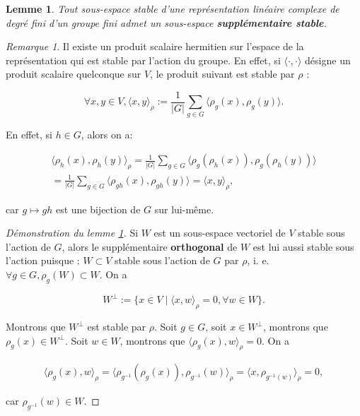 \documentclass[french]{book}
\newtheorem*{protolemma}{Lemme}
\newenvironment{lemma}
    {\colorlet{shadecolor}{pink!15}\begin{shaded}\begin{protolemma}}
    {\end{protolemma}\end{shaded}}
\theoremstyle{definition}
\theoremstyle{remark}
\newtheorem*{remark}{Remarque}
\begin{document}
\begin{lemma}\label{lemme-maschke}
  Tout sous-espace stable d'une représentation linéaire complexe de degré fini d'un groupe fini admet un sous-espace \textbf{supplémentaire \emph{stable}}.
\end{lemma}

\begin{remark}
  {\selectfont{}\relax} Il existe un produit scalaire hermitien sur l'espace de la représentation qui est stable par l'action du groupe. En effet, si \(\langle \cdot, \cdot \rangle \) désigne un produit scalaire quelconque sur \(V\), le produit suivant est stable par \(\rho\) :

  \[\forall x, y \in V, \langle x, y \rangle_{\rho} := \frac{1}{\lvert G \rvert} \sum_{g \in G}^{} \langle \rho_g(x), \rho_g(y) \rangle. \]

  En effet, si \(h \in G\), alors on a:

  \begin{gather*}
    \langle \rho_h(x), \rho_h(y) \rangle _{\rho} = \frac{1}{\lvert G \rvert} \sum_{g \in G}^{} \langle \rho_g(\rho_h(x)), \rho_g (\rho_h(y)) \rangle  \\
    = \frac{1}{\lvert G \rvert} \sum_{g \in G}^{} \langle \rho _{gh}(x), \rho _{gh}(y) \rangle  = \langle x, y \rangle _{\rho},
  \end{gather*}

  car \(g \longmapsto gh\) est une bijection de \(G\) sur lui-même.
\end{remark}


\begin{proof}[Démonstration du lemme \ref{lemme-maschke}]
  Si \(W\) est un sous-espace vectoriel de \(V\) stable sous l'action de \(G\), alors le supplémentaire \textbf{orthogonal} de \(W\) est lui aussi stable sous l'action puisque : \(W \subset V\) stable sous l'action de \(G\) par \(\rho\), i. e. \( \forall g \in G, \rho_g(W) \subset W\). On a

  \[W ^{\perp} := \{  x \in V \mid \langle x, w \rangle _{\rho} = 0,  \forall w \in W \}.\]

  Montrons que \( W ^{\perp}\) est stable par \(\rho\). Soit \(g \in G\), soit \(x \in W ^{\perp}\), montrons que \(\rho_g(x) \in W ^{\perp}\). Soit \(w \in W\), montrons que \(\langle \rho_g(x), w \rangle _{\rho}=0\). On a

  \begin{gather*}
    \langle \rho_g(x), w \rangle_{\rho} = \langle \rho _{g ^{-1} }(\rho_g(x)), \rho _{g ^{-1} }(w) \rangle _{\rho} = \langle x, \rho _{g ^{-1} (w)} \rangle _{\rho} = 0,
  \end{gather*}

  car \(\rho _{g ^{-1} }(w) \in W\).
\end{proof}
\end{document}
